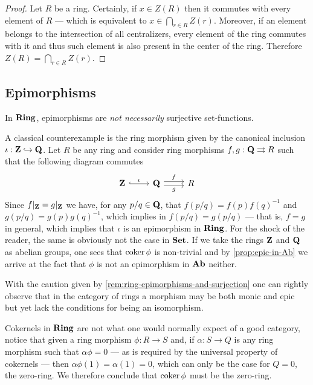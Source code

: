 %
\begin{proof}
Let \(R\) be a ring. Certainly, if \(x \in Z(R)\) then it commutes with every
element of \(R\) --- which is equivalent to \(x \in \bigcap_{r \in R}
Z(r)\). Moreover, if an element belongs to the intersection of all centralizers,
every element of the ring commutes with it and thus such element is also present
in the center of the ring. Therefore \(Z(R) = \bigcap_{r \in R} Z(r)\).
\end{proof}
%

\subsection{Epimorphisms}

%
\begin{remark}
\label{rem:ring-epimorphisms-and-surjection}
In \({\textbf{Ring}}\), epimorphisms are \emph{not necessarily} surjective set-functions.

A classical counterexample is the ring morphism given by the canonical inclusion
\(\iota: \mathbf{Z} \hookrightarrow \mathbf{Q}\). Let \(R\) be any ring and consider ring morphisms
\(f, g: \mathbf{Q} \rightrightarrows R\) such that the following diagram commutes
\[
\begin{tikzcd}
\Z \ar[r, hook, "\iota"]
&\Q \ar[r, shift left, "f"] \ar[r, shift right, swap, "g"]
&R
\end{tikzcd}
\]
Since \(f|_{\mathbf{Z}} = g|_{\mathbf{Z}}\) we have, for any \(p/q \in \mathbf{Q}\), that
\(f(p/q) = f(p) f(q)^{-1}\) and \(g(p/q) = g(p) g(q)^{-1}\), which implies in
\(f(p/q) = g(p/q)\) --- that is, \(f = g\) in general, which implies that
\(\iota\) is an epimorphism in \({\textbf{Ring}}\). For the shock of the reader, the same
is obviously not the case in \({\textbf{Set}}\). If we take the rings \(\mathbf{Z}\) and \(\mathbf{Q}\) as
abelian groups, one sees that \(\operatorname{coker} \phi\) is non-trivial and by
\cref{prop:epic-in-Ab} we arrive at the fact that \(\phi\) is not an epimorphism
in \({\textbf{Ab}}\) neither.
\end{remark}
%

%
\begin{remark}
\label{rem:isomorphisms-in-ring}
With the caution given by \cref{rem:ring-epimorphisms-and-surjection} one can
rightly observe that in the category of rings a morphism may be both monic and
epic but yet lack the conditions for being an isomorphism.
\end{remark}
%

\begin{remark}
\label{rem:cokernel-in-ring}
Cokernels in \({\textbf{Ring}}\) are not what one would normally expect of a good category,
notice that given a ring morphism \(\phi: R \to S\) and, if \(\alpha: S \to Q\)
is any ring morphism such that \(\alpha \phi = 0\) --- as is required by the
universal property of cokernels --- then \(\alpha\phi(1) = \alpha(1) = 0\),
which can only be the case for \(Q = 0\), the zero-ring. We therefore conclude
that \(\operatorname{coker} \phi\) must be the zero-ring.
\end{remark}

